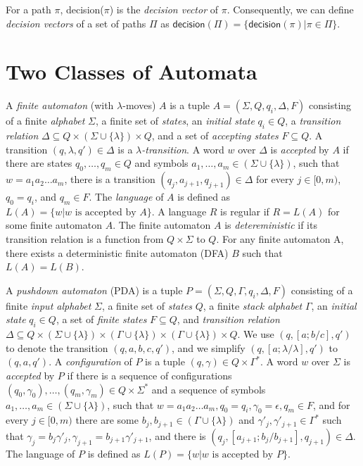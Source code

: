 For a path $\pi$, \textsf{decision}($\pi$) is the \emph{decision vector} of $\pi$. Consequently, we can define \emph{decision vectors} of a set of paths $\Pi$ as $\mathsf{decision}(\Pi) = \{\mathsf{decision}(\pi) | \pi \in \Pi\}$.

\section{Two Classes of Automata}

A \emph{finite automaton} (with $\lambda$-moves) $A$ is a tuple $A = (\Sigma, Q, q_i, \Delta, F)$ consisting of a finite \emph{alphabet} $\Sigma$, a finite set of \emph{states}, an \emph{initial state} $q_i \in Q$, a \emph{transition relation} $\Delta \subseteq Q \times (\Sigma \cup \{\lambda\}) \times Q$, and a set of \emph{accepting states} $F \subseteq Q$. A transition $(q, \lambda, q') \in \Delta$ is a \emph{$\lambda$-transition}. A word $w$ over $\Delta$ is \emph{accepted} by $A$ if there are states $q_0, \dots, q_m \in Q$ and symbols $a_1, \dots, a_m \in (\Sigma \cup \{\lambda\})$, such that $w = a_1a_2 \dots a_m$, there is a transition $(q_j, a_{j+1}, q_{j+1}) \in \Delta$ for every $j \in [0,m)$, $q_0 = q_i$, and $q_m \in F$. The \emph{language} of $A$ is defined as $L(A) = \{w|w \text{ is accepted by } A\} $. A language $R$ is regular if $R = L(A)$ for some finite automaton $A$. The finite automaton $A$ is \emph{detereministic} if its transition relation is a function from $Q \times \Sigma$ to $Q$. For any finite automaton A, there exists a deterministic finite automaton (DFA) $B$ such that $L(A) = L(B)$. 

A \emph{pushdown automaton} (PDA) is a tuple $P = (\Sigma, Q, \Gamma, q_i, \Delta, F)$ consisting of a finite \emph{input alphabet} $\Sigma$, a finite set of \emph{states} $Q$, a finite \emph{stack alphabet} $\Gamma$, an \emph{initial state} $q_i \in Q$, a set of \emph{finite states} $F \subseteq Q$, and \emph{transition relation} $\Delta \subseteq Q \times (\Sigma \cup \{\lambda\}) \times (\Gamma \cup \{\lambda\}) \times (\Gamma \cup \{\lambda\}) \times Q$. We use $(q, [a;b/c], q')$ to denote the transition $(q, a, b, c, q')$, and we simplify $(q, [a;\lambda/\lambda], q')$ to $(q, a, q')$. A \emph{configuration} of $P$ is a tuple $(q,\gamma) \in Q \times \Gamma^*$. A word $w$ over $\Sigma$ is \emph{accepted} by $P$ if there is a sequence of configurations $(q_0, \gamma_0), \dots, (q_m, \gamma_m) \in Q \times \Sigma^*$ and a sequence of symbols $a_1, \dots, a_m \in (\Sigma \cup \{\lambda\})$, such that $w=a_1a_2\dots a_m, q_0 = q_i, \gamma_0 = \epsilon, q_m \in F$, and for every $j \in [0,m)$ there are some $b_j, b_{j+1} \in (\Gamma \cup \{\lambda\})$ and $\gamma'_j, \gamma'_{j+1} \in \Gamma^*$ such that $\gamma_j = b_j\gamma'_j, \gamma_{j+1} = b_{j+1}\gamma'_{j+1}$, and there is $(q_j, [a_{j+1};b_j/b_{j+1}], q_{j+1}) \in \Delta$. The language of $P$ is defined as $L(P) = \{w | w \text{ is accepted by } P\}$.

